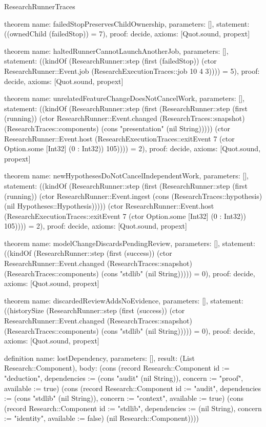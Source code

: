 \begin{lexlean}{ResearchRunnerTraces}
\begin{semanticmodule}
theorem{
  name: failedStopPreservesChildOwnership,
  parameters: [],
  statement: ((ownedChild (failedStop)) = 7),
  proof: decide{},
  axioms: [Quot.sound, propext]
}

theorem{
  name: haltedRunnerCannotLaunchAnotherJob,
  parameters: [],
  statement: ((kindOf (ResearchRunner::step (first (failedStop)) (ctor ResearchRunner::Event.job (ResearchExecutionTraces::job 10 4 3)))) = 5),
  proof: decide{},
  axioms: [Quot.sound, propext]
}

theorem{
  name: unrelatedFeatureChangeDoesNotCancelWork,
  parameters: [],
  statement: ((kindOf (ResearchRunner::step (first (ResearchRunner::step (first (running)) (ctor ResearchRunner::Event.changed (ResearchTraces::snapshot) (ResearchTraces::components) (cons "presentation" (nil String))))) (ctor ResearchRunner::Event.host (ResearchExecutionTraces::exitEvent 7 (ctor Option.some [Int32] (0 : Int32)) 105)))) = 2),
  proof: decide{},
  axioms: [Quot.sound, propext]
}

theorem{
  name: newHypothesesDoNotCancelIndependentWork,
  parameters: [],
  statement: ((kindOf (ResearchRunner::step (first (ResearchRunner::step (first (running)) (ctor ResearchRunner::Event.ingest (cons (ResearchTraces::hypothesis) (nil Hypotheses::Hypothesis))))) (ctor ResearchRunner::Event.host (ResearchExecutionTraces::exitEvent 7 (ctor Option.some [Int32] (0 : Int32)) 105)))) = 2),
  proof: decide{},
  axioms: [Quot.sound, propext]
}

theorem{
  name: modelChangeDiscardsPendingReview,
  parameters: [],
  statement: ((kindOf (ResearchRunner::step (first (success)) (ctor ResearchRunner::Event.changed (ResearchTraces::snapshot) (ResearchTraces::components) (cons "stdlib" (nil String))))) = 0),
  proof: decide{},
  axioms: [Quot.sound, propext]
}

theorem{
  name: discardedReviewAddsNoEvidence,
  parameters: [],
  statement: ((historySize (ResearchRunner::step (first (success)) (ctor ResearchRunner::Event.changed (ResearchTraces::snapshot) (ResearchTraces::components) (cons "stdlib" (nil String))))) = 0),
  proof: decide{},
  axioms: [Quot.sound, propext]
}

definition{
  name: lostDependency,
  parameters: [],
  result: (List Research::Component),
  body: (cons (record Research::Component {id := "deduction", dependencies := (cons "audit" (nil String)), concern := "proof", available := true}) (cons (record Research::Component {id := "audit", dependencies := (cons "stdlib" (nil String)), concern := "context", available := true}) (cons (record Research::Component {id := "stdlib", dependencies := (nil String), concern := "identity", available := false}) (nil Research::Component))))
}


\end{semanticmodule}
\end{lexlean}
